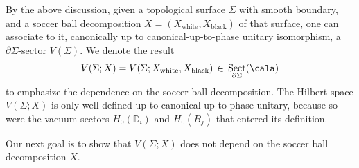 \documentclass[a4paper,10pt,leqno]{amsart}
\newcommand{\ID}{\mathbb{D}}     \newcommand{\cald}{\mathcal{D}}
\theoremstyle{plain}
\theoremstyle{definition}
\theoremstyle{remark}
\DeclareMathOperator{\Rep}{Sect}
\begin{document}
By the above discussion, given a topological surface $\Sigma$ with smooth boundary, and a soccer ball decomposition $X=(X_{\mathrm{white}}, X_{\mathrm{black}})$ of that surface, one can associate to it, canonically up to canonical-up-to-phase unitary isomorphism, a $\partial\Sigma$-sector $V(\Sigma)$.
We denote the result 
\begin{equation}\label{eq: V(Sigma;X)}
V(\Sigma;X)=V(\Sigma;X_{\mathrm{white}}, X_{\mathrm{black}})\,\in\,\Rep_{\partial\Sigma}(\cala)
\end{equation}
to emphasize the dependence on the soccer ball decomposition.
The Hilbert space $V(\Sigma;X)$ is only well defined up to canonical-up-to-phase unitary,
because so were the vacuum sectors $H_0(\ID_i)$ and $H_0(B_j)$ that entered its definition.

Our next goal is to show that $V(\Sigma;X)$ does not depend on the soccer ball decomposition $X$.
\end{document}
